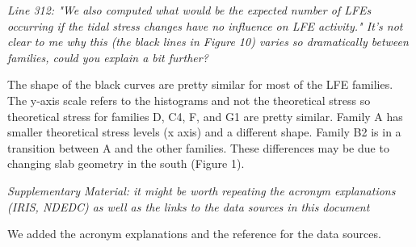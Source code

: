 \documentclass[letterpaper, 12pt]{article}
\begin{document}
\textit{Line 312: "We also computed what would be the expected number of LFEs occurring if the tidal stress changes have no influence on LFE activity." It's not clear to me why this (the black lines in Figure 10) varies so dramatically between families, could you explain a bit further?}

\bigskip


The shape of the black curves are pretty similar for most of the LFE families.  The y-axis scale refers to the histograms and not the theoretical stress so theoretical stress for families D, C4, F, and G1 are pretty similar.  Family A has smaller theoretical stress levels (x axis) and a different shape.  Family B2 is in a transition between A and the other families. These differences may be due to changing slab geometry in the south (Figure 1).

\bigskip

\textit{Supplementary Material: it might be worth repeating the acronym explanations (IRIS, NDEDC) as well as the links to the data sources in this document}

\bigskip

We added the acronym explanations and the reference for the data sources.
\end{document}
